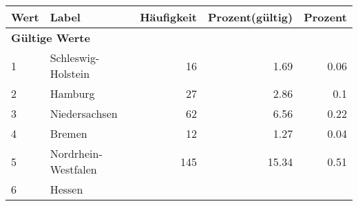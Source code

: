      \begin{longtable}{lXrrr}
     \toprule
     \textbf{Wert} & \textbf{Label} & \textbf{Häufigkeit} & \textbf{Prozent(gültig)} & \textbf{Prozent} \\
     \endhead
     \midrule
     \multicolumn{5}{l}{\textbf{Gültige Werte}}\\

     1 &
     \multicolumn{1}{X}{ Schleswig-Holstein   } &


       \num{16} &
       \num[round-mode=places,round-precision=2]{1.69} &
         \num[round-mode=places,round-precision=2]{0.06} \\

     2 &
     \multicolumn{1}{X}{ Hamburg   } &


       \num{27} &
       \num[round-mode=places,round-precision=2]{2.86} &
         \num[round-mode=places,round-precision=2]{0.1} \\

     3 &
     \multicolumn{1}{X}{ Niedersachsen   } &


       \num{62} &
       \num[round-mode=places,round-precision=2]{6.56} &
         \num[round-mode=places,round-precision=2]{0.22} \\

     4 &
     \multicolumn{1}{X}{ Bremen   } &


       \num{12} &
       \num[round-mode=places,round-precision=2]{1.27} &
         \num[round-mode=places,round-precision=2]{0.04} \\

     5 &
     \multicolumn{1}{X}{ Nordrhein-Westfalen   } &


       \num{145} &
       \num[round-mode=places,round-precision=2]{15.34} &
         \num[round-mode=places,round-precision=2]{0.51} \\

     6 &
     \multicolumn{1}{X}{ Hessen   } &



\end{longtable}
